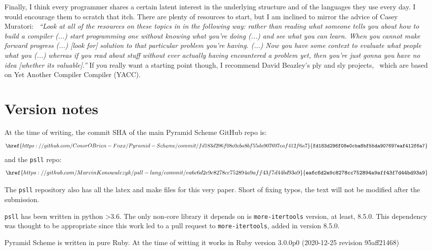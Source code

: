 \documentclass[aip,jcp,reprint,footinbib]{revtex4-1}
\let\tt\texttt
\newcommand\psll{\texttt{psll}\xspace}
\begin{document}
Finally, I think every programmer shares a certain latent interest in the underlying structure and of the languages they use every day. I would encourage them to scratch that itch. There are plenty of resources to start, but I am inclined to mirror the advice of Casey Muratori:~\cite{blow2020qna} \textit{\enquote{Look at all of the resources on these topics in in the following way: rather than reading what someone tells you about how to build a compiler (...) start programming one without knowing what you're doing (...) and see what you can learn. When you cannot make forward progress (...) [look for] solution to that particular problem you're having. (...) Now you have some context to evaluate what people what you (...) whereas if you read about stuff without ever actually having encountered a problem yet, then you're just gonna you have no idea [whether its valuable].}} If you really want a starting point though, I recommend David Beazley's ply and sly projects,~\cite{dbeaz2018,sly,ply} which are based on Yet Another Compiler Compiler (YACC).\cite{levine1992}

\section*{Version notes}

\setlength{\abovedisplayskip}{3pt}
\setlength{\belowdisplayskip}{3pt}

At the time of writing, the commit SHA of the main Pyramid Scheme GitHub repo\cite{pyra_git} is:
\[
    \href{https://github.com/ConorOBrien-Foxx/Pyramid-Scheme/commit/fd183d296f08e0cba8bf55da907697eaf412f6a7}{\tt{fd183d296f08e0cba8bf55da907697eaf412f6a7}}
\]
and the \psll repo:\cite{psll_git}
\[
    \href{https://github.com/MarcinKonowalczyk/psll-lang/commit/ea6c6d2e9c8278cc752894a9aff43f7d44bd93a9}{\tt{ea6c6d2e9c8278cc752894a9aff43f7d44bd93a9}}
\]

The \psll repository also has all the latex and make files for this very paper. Short of fixing typos, the text will not be modified after the submission.

\psll has been written in python >3.6. The only non-core library it depends on is \tt{more-itertools} version, at least, 8.5.0. This dependency was thought to be appropriate since this work led to a pull request to \tt{more-itertools}, added in version 8.5.0.\cite{more_itertools}

Pyramid Scheme is written in pure Ruby. At the time of witting it works in Ruby version 3.0.0p0 (2020-12-25 revision 95aff21468)
\end{document}
